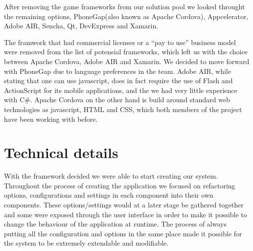 	\bigskip\noindent
	After removing the game frameworks from our solution pool we looked throught the remaining options, PhoneGap(also known as Apache Cordova), Appcelerator, Adobe AIR, Sencha, Qt, DevExpress and Xamarin.
	
	
	\bigskip\noindent
	The framwork that had commercial licenses or a "`pay to use"' business model were removed from the list of potensial frameworks, which left us with the choice between Apache Cordova, Adobe AIR and Xamarin.
	We decided to move forward with PhoneGap due to language preferences in the team. Adobe AIR, while stating that one can use javascript, does in fact require the use of Flash and ActionScript for its mobile applications, and the we had very little experience with C\#.
	Apache Cordova on the other hand is build around standard web technologies as javascript, HTML and CSS, which both members of the project have been working with before.
	
\section{Technical details}
With the framework decided we were able to start creating our system. 
Throughout the process of creating the application we focused on refactoring options, configurations and settings in each component into their own components. These options/settings would at a later stage be gathered together and some were exposed through the user interface in order to make it possible to change the behaviour of the application at runtime. The process of always putting all the configuration and options in the same place made it possible for the system to be extremely extendable and modifiable. 

